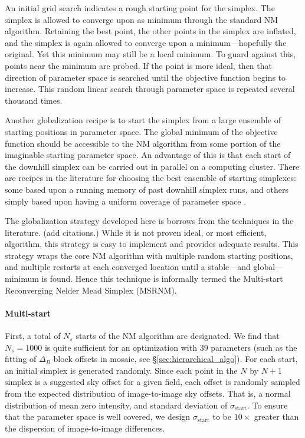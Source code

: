 \documentclass[iop]{emulateapj}
\newcommand{\eg}{\textit{e.g.,~}}
\newcommand{\todo}[1]{\textcolor{BurntOrange}{\textsf{#1}}} %
\newcommand{\Sec}[1]{\S\ref{sec:#1}}  %
\begin{document}
An initial grid search indicates a rough starting point for the simplex.
The simplex is allowed to converge upon as minimum through the standard NM algorithm.
Retaining the best point, the other points in the simplex are inflated, and the simplex is again allowed to converge upon a minimum---hopefully the original.
Yet this minimum may still be a local minimum.
To guard against this, points near the minimum are probed.
If the point is more ideal, then that direction of parameter space is searched until the objective function begins to increase.
This random linear search through parameter space is repeated several thousand times.

Another globalization recipe is to start the simplex from a large ensemble of starting positions in parameter space. The global minimum of the objective function should be accessible to the NM algorithm from some portion of the imaginable starting parameter space. An advantage of this is that each start of the downhill simplex can be carried out in parallel on a computing cluster. There are recipes in the literature for choosing the best ensemble of starting simplexes: some based upon a running memory of past downhill simplex runs, and others simply based upon having a uniform coverage of parameter space \citep[\eg][]{Luersen:2004,Wolff:2004}.

The globalization strategy developed here is borrows from the techniques in the literature.
\todo{(add citations.)}
While it is not proven ideal, or most efficient, algorithm, this strategy is easy to implement and provides adequate results.
This strategy wraps the core NM algorithm with multiple random starting positions, and multiple restarts at each converged location until a stable---and global---minimum is found.
Hence this technique is informally termed the Multi-start Reconverging Nelder Mead Simplex (MSRNM).

\paragraph{Multi-start} First, a total of $N_s$ starts of the NM algorithm are designated.
We find that $N_s=1000$ is quite sufficient for an optimization with 39 parameters (such as the fitting of $\Delta_B$ block offsets in mosaic, see \Sec{hierarchical_algo}).
For each start, an initial simplex is generated randomly.
Since each point in the $N$ by $N+1$ simplex is a suggested sky offset for a given field, each offset is randomly sampled from the expected distribution of image-to-image sky offsets.
That is, a normal distribution of mean zero intensity, and standard deviation of $\sigma_\mathrm{start}$.
To ensure that the parameter space is well covered, we design $\sigma_\mathrm{start}$ to be $10\times$ greater than the dispersion of image-to-image differences.
\end{document}
